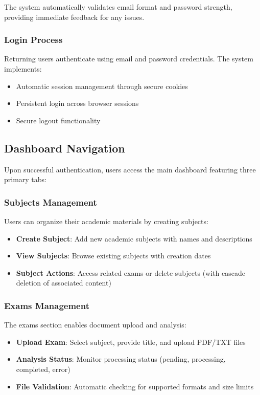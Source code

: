 \documentclass[conference]{IEEEtran}
\begin{document}
The system automatically validates email format and password strength, providing immediate feedback for any issues.

\subsubsection{Login Process}
Returning users authenticate using email and password credentials. The system implements:
\begin{itemize}
\item Automatic session management through secure cookies
\item Persistent login across browser sessions
\item Secure logout functionality
\end{itemize}

\subsection{Dashboard Navigation}

Upon successful authentication, users access the main dashboard featuring three primary tabs:

\subsubsection{Subjects Management}
Users can organize their academic materials by creating subjects:
\begin{itemize}
\item \textbf{Create Subject}: Add new academic subjects with names and descriptions
\item \textbf{View Subjects}: Browse existing subjects with creation dates
\item \textbf{Subject Actions}: Access related exams or delete subjects (with cascade deletion of associated content)
\end{itemize}

\subsubsection{Exams Management}
The exams section enables document upload and analysis:
\begin{itemize}
\item \textbf{Upload Exam}: Select subject, provide title, and upload PDF/TXT files
\item \textbf{Analysis Status}: Monitor processing status (pending, processing, completed, error)
\item \textbf{File Validation}: Automatic checking for supported formats and size limits
\end{itemize}
\end{document}
